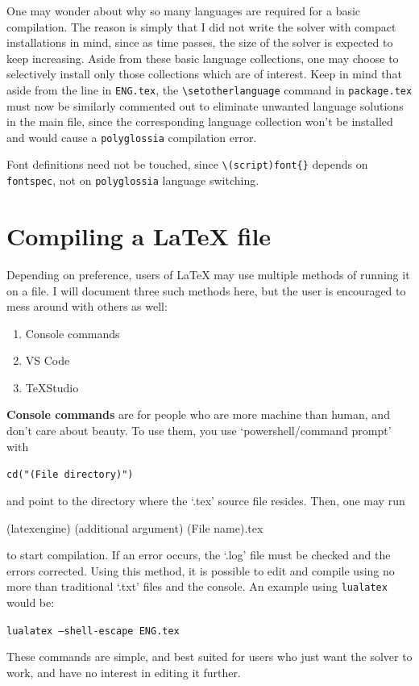 \documentclass[12pt,letterpaper]{article}
\newenvironment{example}{\def\FrameCommand{\colorbox{sampler}} \MakeFramed{\advance\hsize+\width}\begin{center}}{\end{center}\endMakeFramed}
\newenvironment{syntax}{\def\FrameCommand{\colorbox{ruler}} \MakeFramed{\advance\hsize+\width}\begin{center}}{\end{center}\endMakeFramed}
\begin{document}
One may wonder about why so many languages are required for a basic compilation. The reason is simply that I did not write the solver with compact installations in mind, since as time passes, the size of the solver is expected to keep increasing. Aside from these basic language collections, one may choose to selectively install only those collections which are of interest. Keep in mind that aside from the \verb|| line in \texttt{ENG.tex}, the \verb|\setotherlanguage| command in \texttt{package.tex} must now  be similarly commented out to eliminate unwanted language solutions in the main file, since the corresponding language collection won't be installed and would cause a \texttt{polyglossia} compilation error. 

Font definitions need not be touched, since \verb|\(script)font{}| depends on \texttt{fontspec},  not on \texttt{polyglossia} language switching.
\section{\textsf{Compiling a LaTeX file}}
Depending on preference, users of \LaTeX{} may use multiple methods of running it on a file. I will document three such methods here, but the user is encouraged to mess around with others as well:
\begin{enumerate}
    \item Console commands \item VS Code \item \TeX Studio
\end{enumerate}
\textbf{Console commands} are for people who are more machine than human, and don't care about beauty. To use them, you use `powershell/command prompt' with
\begin{syntax}
    \texttt{cd("(File directory)")}
\end{syntax}
and point to the directory where the `.tex' source file resides. Then, one may run
\begin{example}
    (latexengine) (additional argument) (File name).tex
\end{example}
to start compilation. If an error occurs, the `.log' file must be checked and the errors corrected. Using this method, it is possible to edit and compile using no more than  traditional `.txt' files and the console. An example using \texttt{lualatex} would be:
\begin{example}
    \texttt{lualatex --shell-escape ENG.tex}
\end{example}
These commands are simple, and best suited for users who just want the solver to work, and have no interest in editing it further. 
\end{document}
